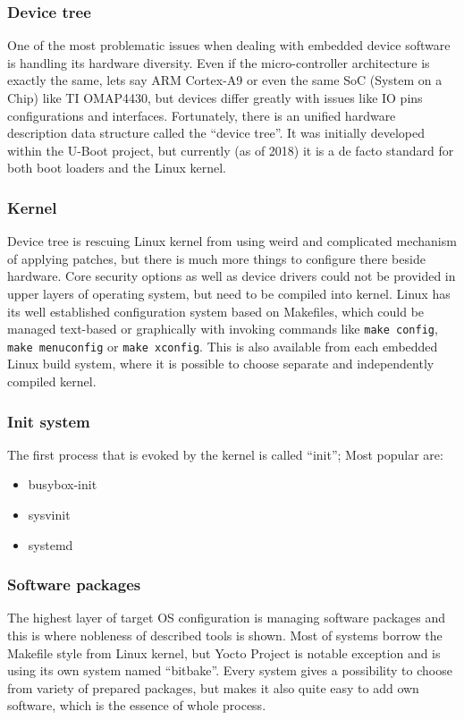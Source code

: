 \documentclass[printmode]{mgr}
\begin{document}
\subsubsection{Device tree}
One of the most problematic issues when dealing with embedded device software is handling its hardware diversity. Even if the micro-controller architecture is exactly the same, lets say ARM Cortex-A9 or even the same SoC (System on a Chip) like TI OMAP4430, but devices differ greatly with issues like IO pins configurations and interfaces. Fortunately, there is an unified hardware description data structure called the ``device tree''. It was initially developed within the U-Boot project, but currently (as of 2018) it is a de facto standard for both boot loaders and the Linux kernel.

\subsubsection{Kernel}
Device tree is rescuing Linux kernel from using weird and complicated mechanism of applying patches, but there is much more things to configure there beside hardware. Core security options as well as device drivers could not be provided in upper layers of operating system, but need to be compiled into kernel. Linux has its well established configuration system based on Makefiles, which could be managed text-based or graphically with invoking commands like \verb|make config|, \verb|make menuconfig| or \verb|make xconfig|. This is also available from each embedded Linux build system, where it is possible to choose separate and independently compiled kernel.

\subsubsection{Init system}

The first process that is evoked by the kernel is called ``init''; Most popular are:

\begin{itemize}
    \item busybox-init
    \item sysvinit
    \item systemd
\end{itemize}

\subsubsection{Software packages}
The highest layer of target OS configuration is managing software packages and this is where nobleness of described tools is shown. Most of systems borrow the Makefile style from Linux kernel, but Yocto Project is notable exception and is using its own system named ``bitbake''. Every system gives a possibility to choose from variety of prepared packages, but makes it also quite easy to add own software, which is the essence of whole process.
\end{document}
